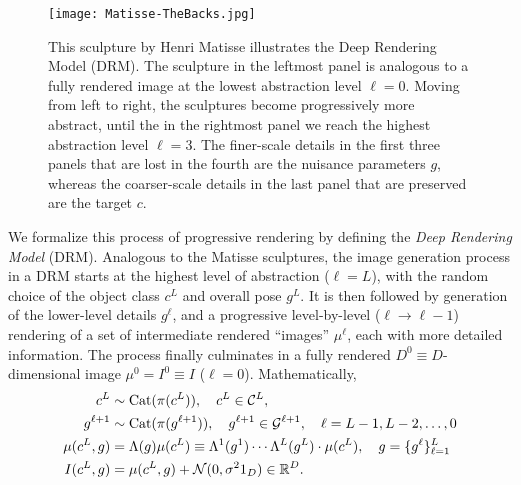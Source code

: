 \documentclass[12pt]{article}
\newcommand{\R}[0]{{ \mathbb{R} }}
\newcommand{\Cl}[0]{{ \mathcal{C} }}
\newcommand{\G}[0]{{ \mathcal{G} }}
\begin{document}
\begin{figure}
   \centering
   \texttt{[image: Matisse-TheBacks.jpg]}
   \caption{This sculpture by Henri Matisse illustrates the Deep Rendering Model (DRM). The sculpture in the leftmost panel is analogous to a fully rendered image at the lowest abstraction level $\ell=0$. Moving from left to right, the sculptures become progressively more abstract, until the in the rightmost panel we reach the highest abstraction level $\ell=3$. The finer-scale details in the first three panels that are lost in the fourth are the nuisance parameters $g$, whereas the coarser-scale details in the last panel that are preserved are the target $c$.}
   \label{fig:matisse}
\end{figure}

We formalize this process of progressive rendering by defining the {\em Deep Rendering Model} (DRM). Analogous to the Matisse sculptures, the image generation process in a DRM starts at the highest level of abstraction ($\ell=L$), with the random choice of the object class $c^L$ and overall pose $g^L$. It is then followed by generation of the lower-level details $g^\ell$, and a progressive level-by-level ($\ell \rightarrow \ell-1$) rendering of a set of intermediate rendered ``images'' $\mu^{\ell}$, each with more detailed information. The process finally culminates in a fully rendered $D^{0}\equiv D$-dimensional image $\mu^{0} = I^{0} \equiv I$ ($\ell=0$). Mathematically,
\begin{align} 
	c^{L} &\sim{\rm Cat}(\pi(c^{L})), \quad c^{L} \in \Cl^{L},
	\nonumber \\
	g^{\ell+1} &\sim{\rm Cat}(\pi(g^{\ell+1})), \quad g^{\ell+1} \in \G^{\ell+1}, \quad \ell = L-1, L-2, \dots, 0 	
	\nonumber \\		
	\mu(c^{L}, g) &=  \Lambda(g) \mu(c^{L}) \equiv \Lambda^{1}(g^{1}) \cdots \Lambda^{L}(g^{L}) \cdot \mu(c^{L}), \quad g=\{g^{\ell}\}_{\ell=1}^{L}
	\nonumber \\
	I(c^{L},g) &= \mu(c^{L}, g) + \mathcal{N}(0, \sigma^{2} 1_{D}) \in \R^{D}.
	\label{eqn:DRM}
\end{align}
\end{document}

